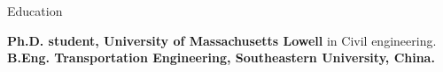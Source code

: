 \begin{rubric}{Education}

\entry*[2017 -- now]%
	\textbf{Ph.D. student, University of Massachusetts Lowell} in Civil engineering.
%
\entry*[2011 -- 2015]%
	\textbf{B.Eng. Transportation Engineering, Southeastern University, China.}\par

%
\end{rubric}